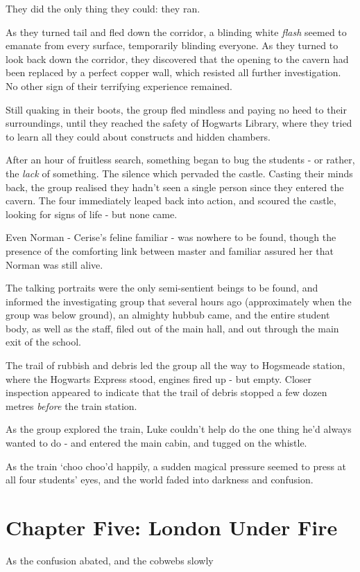 \documentclass[oneside]{book}
\begin{document}
They did the only thing they could: they ran. 

As they turned tail and fled down the corridor, a blinding white {\it flash} seemed to emanate from every surface, temporarily blinding everyone. As they turned to look back down the corridor, they discovered that the opening to the cavern had been replaced by a perfect copper wall, which resisted all further investigation. No other sign of their terrifying experience remained. 

Still quaking in their boots, the group fled mindless and paying no heed to their surroundings, until they reached the safety of Hogwarts Library, where they tried to learn all they could about constructs and hidden chambers. 

After an hour of fruitless search, something began to bug the students - or rather, the {\it lack} of something. The silence which pervaded the castle. Casting their minds back, the group realised they hadn't seen a single person since they entered the cavern. The four immediately leaped back into action, and scoured the castle, looking for signs of life - but none came. 

Even Norman - Cerise's feline familiar - was nowhere to be found, though the presence of the comforting link between master and familiar assured her that Norman was still alive. 

The talking portraits were the only semi-sentient beings to be found, and informed the investigating group that several hours ago (approximately when the group was below ground), an almighty hubbub came, and the entire student body, as well as the staff, filed out of the main hall, and out through the main exit of the school. 

The trail of rubbish and debris led the group all the way to Hogsmeade station, where the Hogwarts Express stood, engines fired up - but empty. Closer inspection appeared to indicate that the trail of debris stopped a few dozen metres {\it before} the train station. 

As the group explored the train, Luke couldn't help do the one thing he'd always wanted to do - and entered the main cabin, and tugged on the whistle. 

As the train `choo choo'd happily, a sudden magical pressure seemed to press at all four students' eyes, and the world faded into darkness and confusion. 

\section{Chapter Five: London Under Fire}

As the confusion abated, and the cobwebs slowly 
\end{document}
